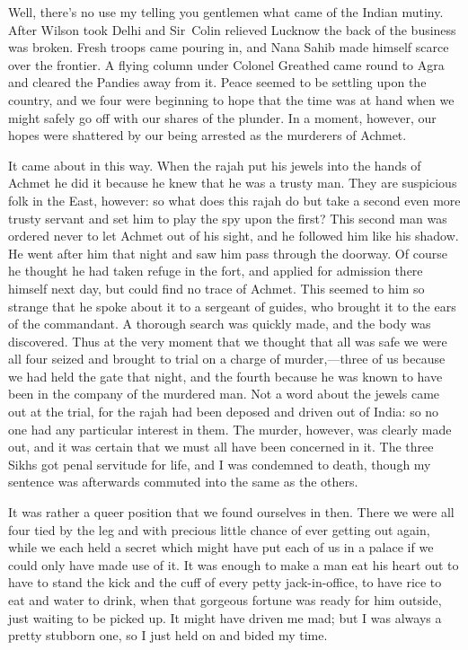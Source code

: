 Well, there's no use my telling you gentlemen what came of the Indian mutiny. After Wilson took Delhi and Sir~Colin relieved Lucknow the back of the business was broken. Fresh troops came pouring in, and Nana Sahib made himself scarce over the frontier. A flying column under Colonel Greathed came round to Agra and cleared the Pandies away from it. Peace seemed to be settling upon the country, and we four were beginning to hope that the time was at hand when we might safely go off with our shares of the plunder. In a moment, however, our hopes were shattered by our being arrested as the murderers of Achmet.

It came about in this way. When the rajah put his jewels into the hands of Achmet he did it because he knew that he was a trusty man. They are suspicious folk in the East, however: so what does this rajah do but take a second even more trusty servant and set him to play the spy upon the first? This second man was ordered never to let Achmet out of his sight, and he followed him like his shadow. He went after him that night and saw him pass through the doorway. Of course he thought he had taken refuge in the fort, and applied for admission there himself next day, but could find no trace of Achmet. This seemed to him so strange that he spoke about it to a sergeant of guides, who brought it to the ears of the commandant. A thorough search was quickly made, and the body was discovered. Thus at the very moment that we thought that all was safe we were all four seized and brought to trial on a charge of murder,—three of us because we had held the gate that night, and the fourth because he was known to have been in the company of the murdered man. Not a word about the jewels came out at the trial, for the rajah had been deposed and driven out of India: so no one had any particular interest in them. The murder, however, was clearly made out, and it was certain that we must all have been concerned in it. The three Sikhs got penal servitude for life, and I was condemned to death, though my sentence was afterwards commuted into the same as the others.

It was rather a queer position that we found ourselves in then. There we were all four tied by the leg and with precious little chance of ever getting out again, while we each held a secret which might have put each of us in a palace if we could only have made use of it. It was enough to make a man eat his heart out to have to stand the kick and the cuff of every petty jack-in-office, to have rice to eat and water to drink, when that gorgeous fortune was ready for him outside, just waiting to be picked up. It might have driven me mad; but I was always a pretty stubborn one, so I just held on and bided my time.

